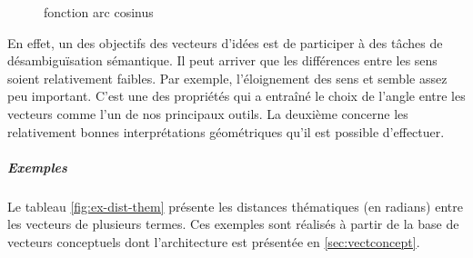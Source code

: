 {\begin{figure}[h]
\caption{fonction arc cosinus}

\label{arcos}
\end{figure}

En effet, un des objectifs des  vecteurs
d'idées est de participer à des tâches de désambiguïsation sémantique.
Il peut arriver que les différences entre les sens soient relativement
faibles. Par exemple, l'éloignement des sens  et
 semble assez peu important. C'est une des
propriétés qui a entraîné le choix de l'angle entre les vecteurs comme
l'un de nos principaux outils. La deuxième 
concerne les relativement bonnes interprétations
géométriques qu'il est possible d'effectuer.

\subparagraph{Exemples}

Le tableau \ref{fig:ex-dist-them} présente les distances thématiques
(en radians) entre les vecteurs de plusieurs termes. Ces exemples sont
réalisés à partir de la base de  vecteurs
conceptuels dont l'architecture est présentée en
\ref{sec:vectconcept}.

\begin{figure}[h]
  

\end{figure}}
